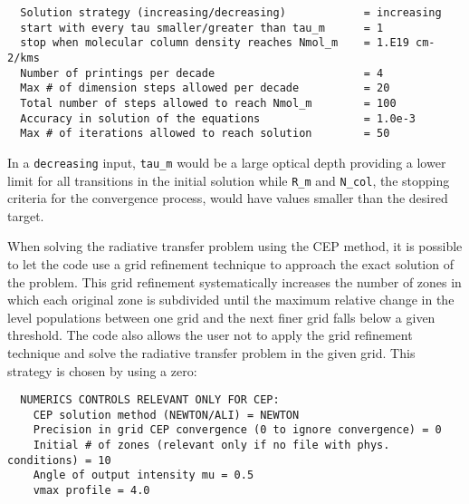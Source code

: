 \documentclass[12pt]{article}
\def\separation {0.5cm}
\begin{document}
\vspace{\separation}
\begin{verbatim}
  Solution strategy (increasing/decreasing)            = increasing 
  start with every tau smaller/greater than tau_m      = 1
  stop when molecular column density reaches Nmol_m    = 1.E19 cm-2/kms
  Number of printings per decade                       = 4
  Max # of dimension steps allowed per decade          = 20
  Total number of steps allowed to reach Nmol_m        = 100
  Accuracy in solution of the equations                = 1.0e-3
  Max # of iterations allowed to reach solution        = 50
\end{verbatim}
In a {\tt decreasing} input, {\tt tau\_m} would be a large optical depth
providing a lower limit for all transitions in the initial solution while
{\tt R\_m} and {\tt N\_col}, the stopping criteria for the convergence process,
would have values smaller than the desired target.

When solving the radiative transfer problem using the CEP method, it is
possible to let the code use a grid refinement technique to approach the exact
solution of the problem. This grid refinement systematically increases the
number of zones in which each original zone is subdivided until the maximum
relative change in the level populations between one grid and the next finer
grid falls below a given threshold. The code also allows the user not to apply
the grid refinement technique and solve the radiative transfer problem in the
given grid. This strategy is chosen by using a zero:

\vspace{\separation}
\begin{verbatim}
  NUMERICS CONTROLS RELEVANT ONLY FOR CEP:
    CEP solution method (NEWTON/ALI) = NEWTON
    Precision in grid CEP convergence (0 to ignore convergence) = 0
    Initial # of zones (relevant only if no file with phys. conditions) = 10   
    Angle of output intensity mu = 0.5
    vmax profile = 4.0
\end{verbatim}
\end{document}
